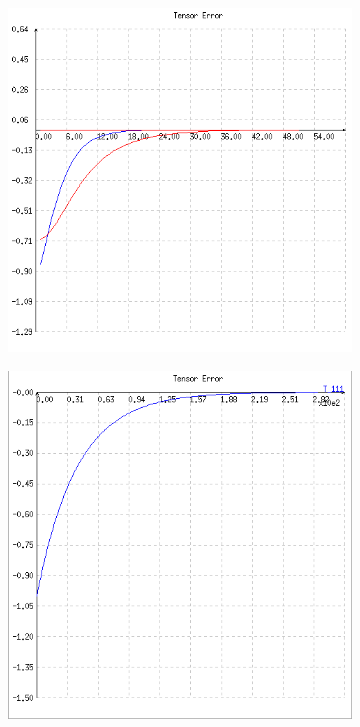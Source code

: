 \begin{figure}[ht!]
\centering
  \centering
  \begin{subfigure}{.48\linewidth}
    \centering
    \includegraphics[width=\linewidth]{figures/plots/ex1cerror.png}
    \caption{}
    \label{fig:ex1comparisona}
  \end{subfigure}
  \begin{subfigure}{.48\linewidth}
    \centering
    \includegraphics[width=\linewidth]{figures/plots/ex1subset.png}

\end{subfigure}
\end{figure}
